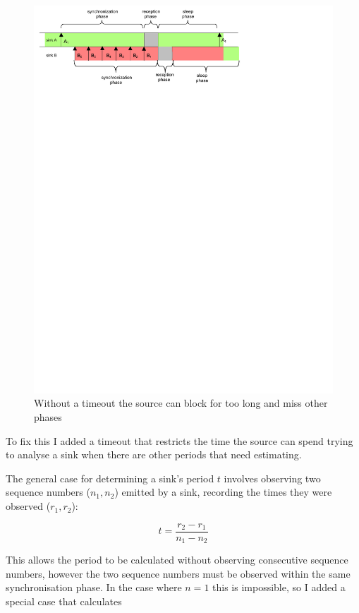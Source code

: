 \documentclass{article}
\begin{document}
\begin{figure}[h]
\includegraphics[trim=1cm 22cm 1cm 1cm]{embs-blocking}
\caption{Without a timeout the source can block for too long and miss other phases}
\label{fig:long-blocking}
\end{figure}

To fix this I added a timeout that restricts the time the source can spend trying to analyse a
sink when there are other periods that need estimating.

The general case for determining a sink's period $t$ involves observing two sequence numbers ($n_1, n_2$) emitted by a sink,
recording the times they were observed ($r_1, r_2$):

$$t = \frac{r_2 - r_1} {n_1 - n_2}$$

This allows the period to be calculated without observing consecutive sequence numbers, however the two
sequence numbers must be observed within the same synchronisation phase. In the case where $n=1$ this is impossible,
so I added a special case that calculates
\end{document}
